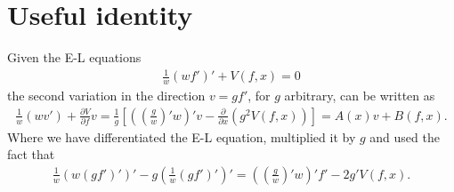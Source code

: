 \clearpage
\chapter{Useful identity}
\label{cha:Identity}

Given the E-L equations
\begin{align}
  \frac{1}{w}\left(wf'\right)'+V(f,x)=0
\end{align}
the second variation in the direction $v=gf'$, for $g$ arbitrary, can
be written as
\begin{align}\label{eq:strange_variation}
  \frac{1}{w}\left(wv'\right)+\frac{\partial V}{\partial
    f}v=\frac{1}{g}\left[\left(\left(\frac{g}{w}\right)'w
  \right)'v-\frac{\partial}{\partial x}\left(g^2 V(f,x)\right)\right]=A(x)v+B(f,x).
\end{align}
Where we have differentiated the E-L equation, multiplied it by $g$
and used the fact that
\begin{align}
  \frac{1}{w}\left(w(gf')'\right)'-g\left(\frac{1}{w}(gf')'\right)'
  =\left(\left(\frac{g}{w}\right)'w \right)'f'-2g'V(f,x).
\end{align}




